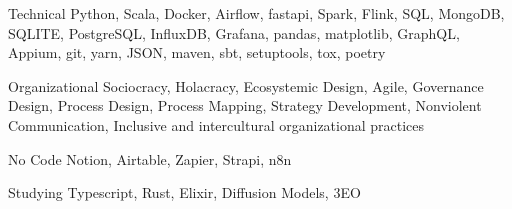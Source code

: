 \documentclass{tccv}
\begin{document}
\begin{factlist}

\item{Technical}
     {Python, Scala, Docker, Airflow, fastapi, Spark, Flink, SQL, MongoDB, SQLITE, PostgreSQL, InfluxDB, Grafana, pandas, matplotlib, GraphQL, Appium, git, yarn, JSON, maven, sbt, setuptools, tox, poetry}

\item{Organizational}
{Sociocracy, Holacracy, Ecosystemic Design, Agile, Governance Design, Process Design, Process Mapping, Strategy Development, Nonviolent Communication, Inclusive and intercultural organizational practices}


\item{No Code}
     {Notion, Airtable, Zapier, Strapi, n8n}

\item{Studying}
    {Typescript, Rust, Elixir, Diffusion Models, 3EO}

\end{factlist}
\end{document}
